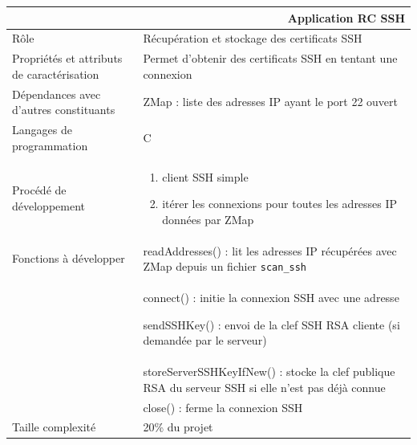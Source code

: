 \documentclass[a4paper,11pt,french]{article}
\begin{document}
\begin{center}
	\vspace*{0.7cm}
	\begin{tabularx}{16cm}{|l|X|}
	\hline
	\multicolumn{2}{|r|}{\textbf{Application RC SSH}}\\
	\hline
	R\^ole & Récupération et stockage des certificats SSH \\
	\hline
	Propriétés et attributs de caractérisation & Permet d'obtenir des certificats SSH en tentant une connexion  \\
	\hline
	Dépendances avec d'autres constituants & ZMap : liste des adresses IP ayant le port 22 ouvert\\
	\hline
	Langages de programmation & C \\
	\hline
	Procédé de développement & \begin{enumerate} \item client SSH simple \item itérer les connexions pour toutes les adresses IP données par ZMap \end{enumerate} \\
	\hline
	Fonctions à développer & readAddresses() : lit les adresses IP récupérées avec ZMap depuis un fichier \verb+scan_ssh+ \\
	& connect() : initie la connexion SSH avec une adresse \item sendSSHKey() : envoi de la clef SSH RSA cliente (si demandée par le serveur) \\
	& storeServerSSHKeyIfNew() : stocke la clef publique RSA du serveur SSH si elle n'est pas déjà connue \\    
	& close() : ferme la connexion SSH\\
	\hline
	Taille complexité & 20\% du projet\\
	\hline
	\end{tabularx}
\end{center}
\end{document}
